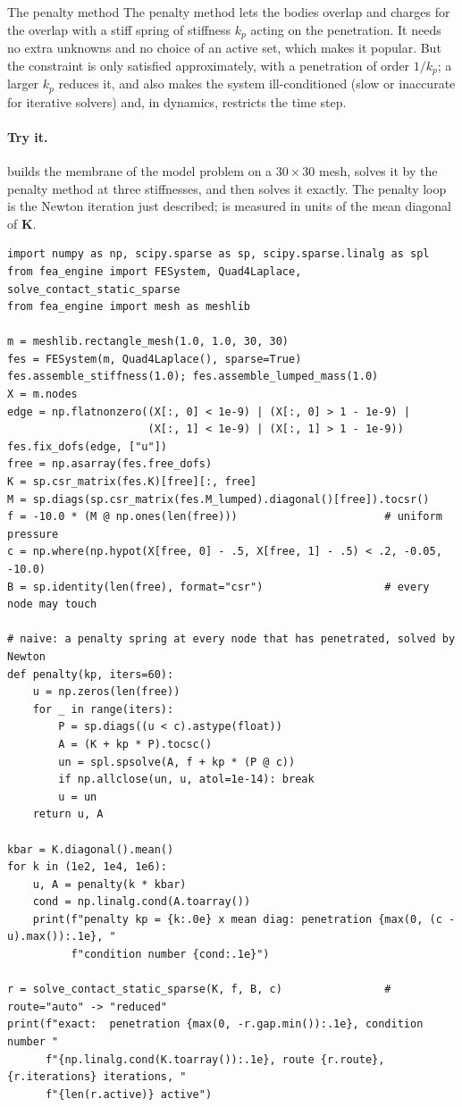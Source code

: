 \begin{sidenote}{The penalty method}
The penalty method lets the bodies overlap and charges for the overlap with a stiff spring of stiffness $k_p$ acting on the penetration. It needs no extra unknowns and no choice of an active set, which makes it popular. But the constraint is only satisfied approximately, with a penetration of order $1/k_p$; a larger $k_p$ reduces it, and also makes the system ill-conditioned (slow or inaccurate for iterative solvers) and, in dynamics, restricts the time step.
\end{sidenote}

\paragraph{Try it.}  builds the membrane of the model problem on a $30\times30$ mesh, solves it by the penalty method at three stiffnesses, and then solves it exactly. The penalty loop is the Newton iteration just described;  is measured in units of the mean diagonal of $\bm K$.

\begin{lstlisting}[caption={The membrane obstacle problem: penalty at three stiffnesses against the exact solution (run with the package on the path).},label={lst:ct-penalty}]
import numpy as np, scipy.sparse as sp, scipy.sparse.linalg as spl
from fea_engine import FESystem, Quad4Laplace, solve_contact_static_sparse
from fea_engine import mesh as meshlib

m = meshlib.rectangle_mesh(1.0, 1.0, 30, 30)
fes = FESystem(m, Quad4Laplace(), sparse=True)
fes.assemble_stiffness(1.0); fes.assemble_lumped_mass(1.0)
X = m.nodes
edge = np.flatnonzero((X[:, 0] < 1e-9) | (X[:, 0] > 1 - 1e-9) |
                      (X[:, 1] < 1e-9) | (X[:, 1] > 1 - 1e-9))
fes.fix_dofs(edge, ["u"])
free = np.asarray(fes.free_dofs)
K = sp.csr_matrix(fes.K)[free][:, free]
M = sp.diags(sp.csr_matrix(fes.M_lumped).diagonal()[free]).tocsr()
f = -10.0 * (M @ np.ones(len(free)))                       # uniform pressure
c = np.where(np.hypot(X[free, 0] - .5, X[free, 1] - .5) < .2, -0.05, -10.0)
B = sp.identity(len(free), format="csr")                   # every node may touch

# naive: a penalty spring at every node that has penetrated, solved by Newton
def penalty(kp, iters=60):
    u = np.zeros(len(free))
    for _ in range(iters):
        P = sp.diags((u < c).astype(float))
        A = (K + kp * P).tocsc()
        un = spl.spsolve(A, f + kp * (P @ c))
        if np.allclose(un, u, atol=1e-14): break
        u = un
    return u, A

kbar = K.diagonal().mean()
for k in (1e2, 1e4, 1e6):
    u, A = penalty(k * kbar)
    cond = np.linalg.cond(A.toarray())
    print(f"penalty kp = {k:.0e} x mean diag: penetration {max(0, (c - u).max()):.1e}, "
          f"condition number {cond:.1e}")

r = solve_contact_static_sparse(K, f, B, c)                # route="auto" -> "reduced"
print(f"exact:  penetration {max(0, -r.gap.min()):.1e}, condition number "
      f"{np.linalg.cond(K.toarray()):.1e}, route {r.route}, {r.iterations} iterations, "
      f"{len(r.active)} active")
\end{lstlisting}

